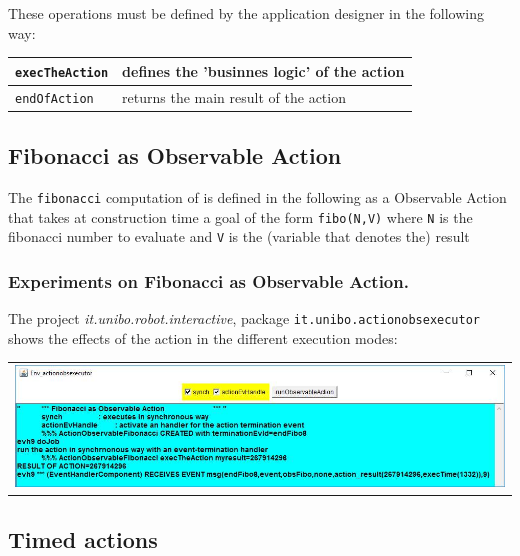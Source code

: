 These operations must be defined by the application designer in the following way:

\medskip 
\begin{tabular}{|l|l|}
\hline 
\texttt{execTheAction} & defines the 'businnes logic' of the action \\ 
\hline 
\texttt{endOfAction} & returns the main result of the action \\ 
\hline 
\end{tabular} 
 
\subsection{Fibonacci as Observable Action}
The \texttt{fibonacci} computation of  is defined in the following as a Observable Action that takes at construction time a goal of the form \texttt{fibo(N,V)} where \texttt{N} is the fibonacci number to evaluate and \texttt{V} is the (variable that denotes the) result



\subsubsection{Experiments on Fibonacci as Observable Action.}

The project \textit{it.unibo.robot.interactive}, package \texttt{it.unibo.actionobsexecutor} shows the effects of the action in the different execution modes:



\begin{center}
\begin{tabular}{ c }
     \includegraphics[scale = 0.6]{img/actionObs.jpg}\\
\end{tabular}{   }
\end{center}


 \newpage 
\subsection{Timed actions}

